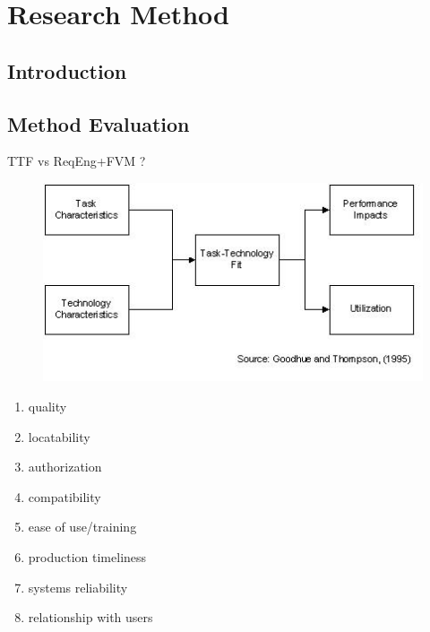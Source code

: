 \chapter{Research Method}


\section{Introduction}


\section{Method Evaluation}

TTF vs ReqEng+FVM ?

\begin{figure}[ht]
    \includegraphics[width=0.7\linewidth]{images/methodology/ttf.jpg}\centering
    \caption{\cite{Goodhue1995Task-TechnologyPerformance}}
\end{figure}

\begin{enumerate}
    \item quality
    \item locatability
    \item authorization
    \item compatibility
    \item ease of use/training
    \item production timeliness
    \item systems reliability
    \item relationship with users
\end{enumerate}


